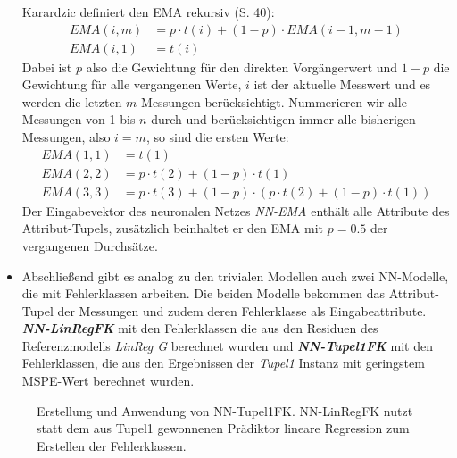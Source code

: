 \documentclass[
	12pt,
	a4paper,
	BCOR10mm,
	DIV14,
	listof=totoc,
	bibliography=totoc,
	headsepline
]{scrreprt}
\begin{document}
\begin{itemize}
	Karardzic definiert den EMA rekursiv \cite{kantardzic2011data} (S. 40):
	\begin{align*}
	EMA(i,m) &= p \cdot t(i)+(1-p) \cdot EMA(i-1,m-1)\\
	EMA(i,1) &= t(i)
	\end{align*}
	Dabei ist $p$ also die Gewichtung für den direkten Vorgängerwert und $1-p$ die Gewichtung für alle vergangenen Werte, $i$ ist der aktuelle Messwert und es werden die letzten $m$ Messungen berücksichtigt. Nummerieren wir alle Messungen von 1 bis $n$ durch und berücksichtigen immer alle bisherigen Messungen, also $i = m$, so sind die ersten Werte:
	\begin{align*}
	EMA(1,1) &= t(1)\\
	EMA(2,2) &=  p \cdot t(2)+(1-p) \cdot t(1)\\
	EMA(3,3) &=  p \cdot t(3)+(1-p) \cdot (p \cdot t(2)+(1-p) \cdot t(1))
	\end{align*}
	Der Eingabevektor des neuronalen Netzes \textit{NN-EMA} enthält alle Attribute des Attribut-Tupels, zusätzlich beinhaltet er den EMA mit $p=0.5$ der vergangenen Durchsätze.
	\item Abschließend gibt es analog zu den trivialen Modellen auch zwei NN-Modelle, die mit Fehlerklassen arbeiten.
	Die beiden Modelle bekommen das Attribut-Tupel der Messungen und zudem deren Fehlerklasse als Eingabeattribute.
	\textit{\textbf{NN-LinRegFK}} mit den Fehlerklassen die aus den Residuen des Referenzmodells \textit{LinReg G} berechnet wurden und \textit{\textbf{NN-Tupel1FK}} mit den Fehlerklassen, die aus den Ergebnissen der \textit{Tupel1} Instanz mit geringstem MSPE-Wert berechnet wurden.
\end{itemize}

\begin{figure}
	\centering
	\caption{Erstellung und Anwendung von NN-Tupel1FK. NN-LinRegFK nutzt statt dem aus Tupel1 gewonnenen Prädiktor lineare Regression zum Erstellen der Fehlerklassen.}
	\label{fig:linregfkvstupel1fk}
\end{figure}
\end{document}
